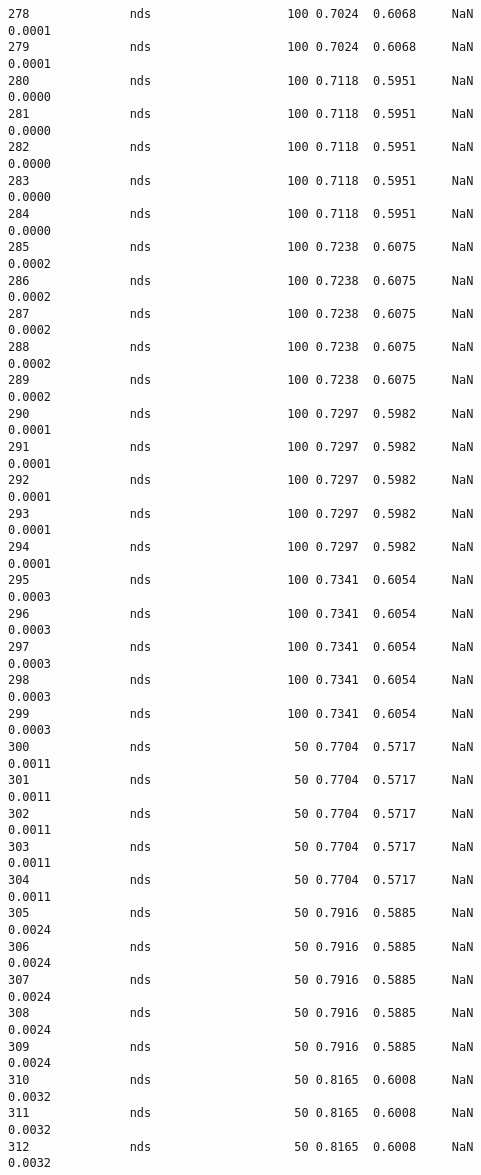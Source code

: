 \documentclass[11pt]{article}
\begin{document}
\begin{Verbatim}[commandchars=\\\{\}]
278              nds                   100 0.7024  0.6068     NaN 0.0001   
279              nds                   100 0.7024  0.6068     NaN 0.0001   
280              nds                   100 0.7118  0.5951     NaN 0.0000   
281              nds                   100 0.7118  0.5951     NaN 0.0000   
282              nds                   100 0.7118  0.5951     NaN 0.0000   
283              nds                   100 0.7118  0.5951     NaN 0.0000   
284              nds                   100 0.7118  0.5951     NaN 0.0000   
285              nds                   100 0.7238  0.6075     NaN 0.0002   
286              nds                   100 0.7238  0.6075     NaN 0.0002   
287              nds                   100 0.7238  0.6075     NaN 0.0002   
288              nds                   100 0.7238  0.6075     NaN 0.0002   
289              nds                   100 0.7238  0.6075     NaN 0.0002   
290              nds                   100 0.7297  0.5982     NaN 0.0001   
291              nds                   100 0.7297  0.5982     NaN 0.0001   
292              nds                   100 0.7297  0.5982     NaN 0.0001   
293              nds                   100 0.7297  0.5982     NaN 0.0001   
294              nds                   100 0.7297  0.5982     NaN 0.0001   
295              nds                   100 0.7341  0.6054     NaN 0.0003   
296              nds                   100 0.7341  0.6054     NaN 0.0003   
297              nds                   100 0.7341  0.6054     NaN 0.0003   
298              nds                   100 0.7341  0.6054     NaN 0.0003   
299              nds                   100 0.7341  0.6054     NaN 0.0003   
300              nds                    50 0.7704  0.5717     NaN 0.0011   
301              nds                    50 0.7704  0.5717     NaN 0.0011   
302              nds                    50 0.7704  0.5717     NaN 0.0011   
303              nds                    50 0.7704  0.5717     NaN 0.0011   
304              nds                    50 0.7704  0.5717     NaN 0.0011   
305              nds                    50 0.7916  0.5885     NaN 0.0024   
306              nds                    50 0.7916  0.5885     NaN 0.0024   
307              nds                    50 0.7916  0.5885     NaN 0.0024   
308              nds                    50 0.7916  0.5885     NaN 0.0024   
309              nds                    50 0.7916  0.5885     NaN 0.0024   
310              nds                    50 0.8165  0.6008     NaN 0.0032   
311              nds                    50 0.8165  0.6008     NaN 0.0032   
312              nds                    50 0.8165  0.6008     NaN 0.0032   

\end{Verbatim}
\end{document}
